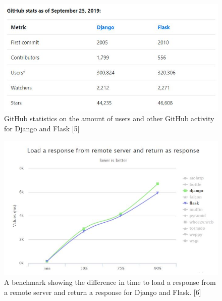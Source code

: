 \documentclass[12pt,journal,compsoc]{IEEEtran}
\newenvironment{subs}
  {\adjustwidth{1em}{0pt}}
  {\endadjustwidth}
\begin{document}
\begin{subs}
\begin{subs}
\begin{figure}[H]
\centering
\includegraphics[width=5in]{images/github_stats_data.JPG}
\caption{GitHub statistics on the amount of users and other GitHub activity for Django and Flask [5]}
\label{fig:back_users}
\end{figure}

\begin{figure}[H]
\centering
\includegraphics[width=5in]{images/back_load.JPG}
\caption{A benchmark showing the difference in time to load a response from a remote server and return a response for Django and Flask. [6]}
\label{fig:back_load}
\end{figure}


\end{subs}
\end{subs}
\end{document}
